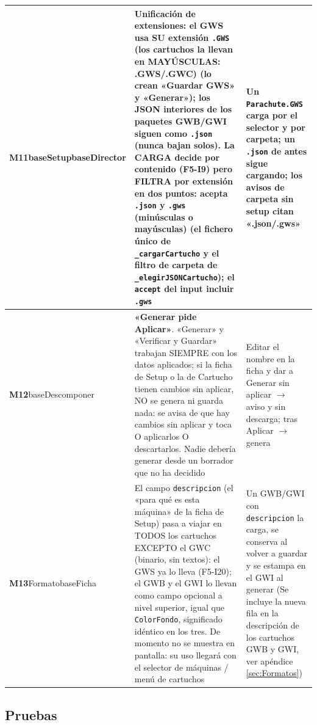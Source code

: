 \begin{xltabular}{\textwidth}{>{\RaggedRight\arraybackslash}p{3cm} >{\RaggedRight\arraybackslash{}\hsize}X >{\RaggedRight\arraybackslash{}\hsize}X}
	\midrule
	\textbf{M11}\newline baseSetup\newline baseDirector & Unificación de extensiones: el GWS usa SU extensión \texttt{.GWS} (los cartuchos la llevan en MAYÚSCULAS: .GWS/.GWC) (lo crean «Guardar GWS» y «Generar»); los JSON interiores de los paquetes GWB/GWI siguen como \texttt{.json} (nunca bajan solos). La CARGA decide por contenido (F5-I9) pero FILTRA por extensión en dos puntos: acepta \texttt{.json} y \texttt{.gws} (minúsculas o mayúsculas) (el fichero único de \texttt{\_cargarCartucho} y el filtro de carpeta de \texttt{\_elegirJSONCartucho}); el \texttt{accept} del input incluir \texttt{.gws} & Un \texttt{Parachute.GWS} carga por el selector y por carpeta; un \texttt{.json} de antes sigue cargando; los avisos de carpeta sin setup citan «.json/.gws» \\
	\midrule
	\textbf{M12}\newline baseDescomponer & \textbf{«Generar pide Aplicar»}. «Generar» y «Verificar y Guardar» trabajan SIEMPRE con los datos aplicados; si la ficha de Setup o la de Cartucho tienen cambios sin aplicar, NO se genera ni guarda nada: se avisa de que hay cambios sin aplicar y toca O aplicarlos O descartarlos. Nadie debería generar desde un borrador que no ha decidido & Editar el nombre en la ficha y dar a Generar sin aplicar $\to$ aviso y sin descarga; tras Aplicar $\to$ genera \\
	\midrule
	\textbf{M13}\newline Formato\newline baseFicha & El campo \texttt{descripcion} (el «para qué es esta máquina» de la ficha de Setup) pasa a viajar en TODOS los cartuchos EXCEPTO el GWC (binario, sin textos): el GWS ya lo lleva (F5-I20); el GWB y el GWI lo llevan como campo opcional a nivel superior, igual que \texttt{ColorFondo}, significado idéntico en los tres. De momento no se muestra en pantalla: su uso llegará con el selector de máquinas / menú de cartuchos & Un GWB/GWI con \texttt{descripcion} la carga, se conserva al volver a guardar y se estampa en el GWI al generar (Se incluye la nueva fila en la descripción de los cartuchos GWB y GWI, ver apéndice \ref{sec:Formatos}) \\
	\bottomrule
\end{xltabular}



\subsection{Pruebas}
\label{sec:F5I17Pruebas}

